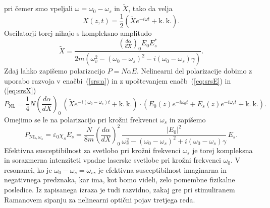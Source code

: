 pri čemer smo vpeljali $\omega = \omega_0-\omega_s$ in $\tilde{X}$, tako da velja
\begin{equation}
X(z,t) = \frac{1}{2}\left(\tilde{X}e^{-i\omega t}+ \mathrm{k.~k.}\right)\!.
\label{eq:srsX}
\end{equation}
Oscilatorji torej nihajo s kompleksno amplitudo
\begin{equation}
\tilde{X} = \frac{\left(\frac{d\alpha}{dX}\right)_0 E_0 E_s^*}{2m\left(
\omega_v^2-(\omega_0-\omega_s)^2-i(\omega_0-\omega_s)\gamma\right)}.
\end{equation}
Zdaj lahko zapišemo polarizacijo $P = N\alpha E$. Nelinearni del
polarizacije dobimo z uporabo razvoja v enačbi~(\ref{srs:a}) 
in z upoštevanjem enačb~(\ref{eq:srsE}) in (\ref{eq:srsX}) 
\begin{equation}
P_{\mathrm{NL}} = \frac{1}{4} N \left(\frac{d\alpha}{dX}\right)_0 \, \left(\tilde{X}
e^{-i(\omega_0-\omega_s)t}
+ \mathrm{k.~k.}\right) \cdot \left( E_0(z)e^{-i\omega_0t}+ E_s(z)e^{-i\omega_st} + \mathrm{k.~k.}\right)\!.
\end{equation}
Omejimo se le na polarizacijo pri krožni frekvenci $\omega_s$ in zapišemo
\begin{equation}
P_{\mathrm{NL},\omega_s} = \varepsilon_0 \chi_s E_s = 
\frac{N }{8m}\left(\frac{d\alpha}{dX}\right)_0^2 \, 
\frac{|E_0|^2}{\omega_v^2-(\omega_0-\omega_s)^2+i(\omega_0-\omega_s)\gamma}\,E_s.
\label{srs:chi}
\end{equation}
Efektivna susceptibilnost za svetlobo pri krožni frekvenci $\omega_s$ 
je  torej kompleksna in sorazmerna intenziteti 
vpadne laserske svetlobe pri krožni frekvenci $\omega_0$. 
V resonanci, ko je $\omega_0-\omega_s = \omega_v$, je efektivna susceptibilnost
imaginarna in negativnega predznaka, kar ima, kot bomo videli, zelo pomembne 
fizikalne posledice. Iz zapisanega izraza je tudi razvidno, zakaj gre pri 
stimuliranem Ramanovem sipanju za nelinearni optični pojav tretjega reda. 

